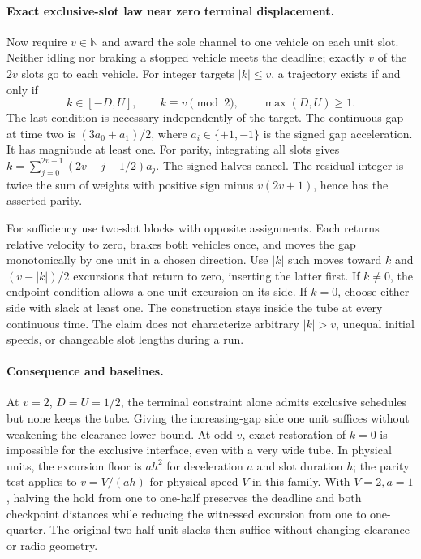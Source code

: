 \documentclass{article}
\begin{document}
\paragraph{Exact exclusive-slot law near zero terminal displacement.}
Now require $v\in\mathbb N$ and award the sole channel to one vehicle
on each unit slot. Neither idling nor braking a stopped vehicle meets
the deadline; exactly $v$ of the $2v$ slots go to each vehicle. For
integer targets $|k|\le v$, a trajectory exists if and only if
\[
 k\in[-D,U],\qquad k\equiv v\pmod 2,\qquad \max(D,U)\ge1 .
\]
The last condition is necessary independently of the target.
The continuous gap at time two is $(3a_0+a_1)/2$, where
$a_i\in\{+1,-1\}$ is the signed gap acceleration. It has magnitude
at least one. For parity, integrating all slots gives
$k=\sum_{j=0}^{2v-1}(2v-j-1/2)a_j$. The signed halves cancel.
The residual integer is twice the sum of weights with positive sign
minus $v(2v+1)$, hence has the asserted parity.

For sufficiency use two-slot blocks with opposite assignments.
Each returns relative velocity to zero, brakes both vehicles once,
and moves the gap monotonically by one unit in a chosen direction.
Use $|k|$ such moves toward $k$ and $(v-|k|)/2$ excursions that return
to zero, inserting the latter first. If $k\ne0$, the endpoint condition
allows a one-unit excursion on its side. If $k=0$, choose either side
with slack at least one. The construction stays inside the tube at every
continuous time. The claim does not characterize arbitrary $|k|>v$,
unequal initial speeds, or changeable slot lengths during a run.

\paragraph{Consequence and baselines.}
At $v=2$, $D=U=1/2$, the terminal constraint alone admits exclusive
schedules but none keeps the tube. Giving the increasing-gap side
one unit suffices without weakening the clearance lower bound. At
odd $v$, exact restoration of $k=0$ is impossible for the exclusive
interface, even with a very wide tube. In physical units, the excursion
floor is $a h^2$ for deceleration $a$ and slot duration $h$; the parity
test applies to $v=V/(a h)$ for physical speed $V$ in this family.
With $V=2,a=1$, halving the hold from one to one-half preserves the
deadline and both checkpoint distances while reducing the witnessed
excursion from one to one-quarter. The original two half-unit slacks
then suffice without changing clearance or radio geometry.
\end{document}
